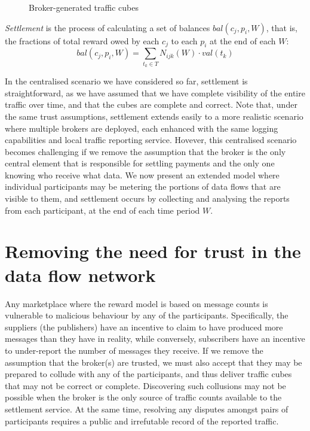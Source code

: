 \documentclass[chi_draft]{sigchi}
\begin{document}
\begin{figure}
	\caption{Broker-generated traffic cubes}
	\label{fig:cubes}
\end{figure}

\textit{Settlement} is the process of calculating a set of balances $ \mathit{bal}(c_j, p_i, W) $, that is, the fractions of total reward owed by each $c_j$ to each $p_i$ at the end of each $W$:
\begin{equation}
\mathit{bal}(c_j, p_i, W) = \sum_{t_k \in T} N_{ijk}(W) \cdot \mathit{val}(t_k)
\label{eq:balance}
\end{equation}

In the centralised scenario we have considered so far, settlement is straightforward, as we have assumed that we have complete visibility of the entire traffic over time, and that the cubes are complete and correct.
Note that, under the same trust assumptions, settlement extends easily to a more realistic scenario where multiple brokers are deployed, each enhanced with the same logging capabilities and local traffic reporting service.
Hovever, this centralised scenario becomes challenging if we remove the assumption that the broker is the only central element that is responsible for settling payments and the only one knowing who receive what data.
We now present an extended model where individual participants may be metering the portions of data flows that are visible to them, and settlement occurs by collecting and analysing the reports from each participant, at the end of each time period $W$.

\section{Removing the need  for trust in the data flow network}  \label{sec:no-trust}

Any marketplace where the reward model is based on message counts is vulnerable to malicious behaviour by any of the participants. Specifically, the suppliers (the publishers) have an incentive to claim to have produced more messages than they have in reality, while conversely, subscribers have an incentive to under-report the number of messages they receive.
%
If we remove the assumption that the broker(s) are trusted, we must also accept that they may be prepared to collude with any of the participants, and thus deliver traffic cubes that may not be correct or complete.
Discovering such collusions may not be possible when the broker is the only source of traffic counts available to the settlement service.  At the same time, resolving any disputes amongst pairs of participants requires a public and irrefutable record of the reported traffic.
\end{document}
